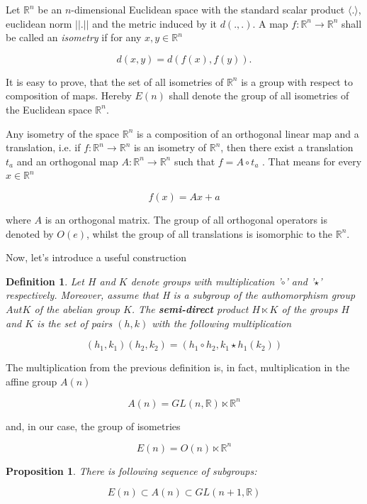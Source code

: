\documentclass[a4paper,12pt]{amsart}
\newtheorem{definition}{Definition}
\newtheorem{proposition}{Proposition}
\begin{document}
	Let $\mathbb{R}^n$ be an $n$-dimensional Euclidean space with the standard scalar product $\langle.\rangle$, euclidean norm $||.||$ and the metric induced by it $d(., .)$. A map $f : \mathbb{R}^n \rightarrow \mathbb{R}^n$ shall be called an \textit{isometry} if for any $x, y \in \mathbb{R}^n$
	
	$$d(x, y) = d(f(x), f(y)).$$
	
	It is easy to prove, that the set of all isometries of $\mathbb{R}^n$ is a group with respect to composition of maps. Hereby $E(n)$ shall denote the group of all isometries of the Euclidean space $\mathbb{R}^n$. 
	
	Any isometry of the space $\mathbb{R}^n$ is a composition of an orthogonal linear map and a translation, i.e. if $f : \mathbb{R}^n \rightarrow \mathbb{R}^n$ is an isometry of $\mathbb{R}^n$, then there exist a translation $t_a$ and an orthogonal map $A: \mathbb{R}^n \rightarrow \mathbb{R}^n$ such that $f = A \circ t_a$ . That means for every $x \in \mathbb{R}^n$
	
	$$f(x) = Ax + a$$ 
	
	where $A$ is an orthogonal matrix. The group of all orthogonal operators is denoted by $O(e)$, whilst the group of all translations is isomorphic to the $\mathbb{R}^n$.
	
	Now, let's introduce a useful construction
	
	\begin{definition}
		Let $H$ and $K$ denote groups with multiplication '$\circ$' and '$\star$' respectively. Moreover, assume that H is a subgroup of the authomorphism group $Aut K$ of the abelian group $K$. The \textbf{semi-direct} product $H \ltimes K$ of the groups $H$ and $K$ is the set of pairs $(h, k)$ with the following multiplication
		
		$$(h_1, k_1)(h_2, k_2) = (h_1 \circ h_2, k_1 \star h_1 (k_2))$$
	\end{definition}
	
	The multiplication from the previous definition is, in fact, multiplication in the affine group $A(n)$ 
	
	$$A(n) = GL(n, \mathbb{R}) \ltimes \mathbb{R}^n$$
	
	and, in our case, the group of isometries 
	
	$$E(n) = O(n) \ltimes \mathbb{R}^n$$
	
	
	\begin{proposition}
		There is following sequence of subgroups: 
		
		$$E(n) \subset A(n) \subset GL(n + 1, \mathbb{R})$$
	\end{proposition}
\end{document}
